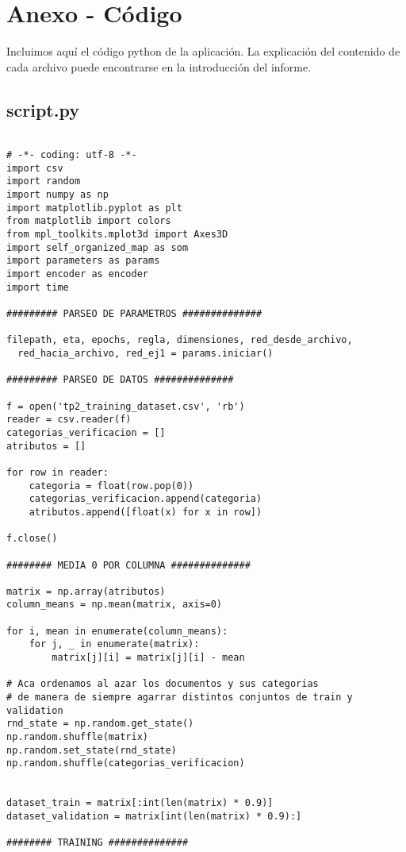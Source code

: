 \section{Anexo - Código}
Incluimos aquí el código python de la aplicación. La explicación del contenido de cada archivo puede encontrarse en la introducción del informe.

\subsection{script.py}

\begin{changemargin}{-2.0cm}{-1.5cm} 
\begin{verbatim}

# -*- coding: utf-8 -*-
import csv
import random
import numpy as np
import matplotlib.pyplot as plt
from matplotlib import colors
from mpl_toolkits.mplot3d import Axes3D
import self_organized_map as som
import parameters as params
import encoder as encoder
import time

######### PARSEO DE PARAMETROS ##############

filepath, eta, epochs, regla, dimensiones, red_desde_archivo, 
  red_hacia_archivo, red_ej1 = params.iniciar()

######### PARSEO DE DATOS ##############

f = open('tp2_training_dataset.csv', 'rb')
reader = csv.reader(f)
categorias_verificacion = []
atributos = []

for row in reader:
    categoria = float(row.pop(0))
    categorias_verificacion.append(categoria)
    atributos.append([float(x) for x in row])

f.close()

######## MEDIA 0 POR COLUMNA ##############

matrix = np.array(atributos)
column_means = np.mean(matrix, axis=0)

for i, mean in enumerate(column_means):
    for j, _ in enumerate(matrix):
        matrix[j][i] = matrix[j][i] - mean

# Aca ordenamos al azar los documentos y sus categorias
# de manera de siempre agarrar distintos conjuntos de train y validation
rnd_state = np.random.get_state()
np.random.shuffle(matrix)
np.random.set_state(rnd_state)
np.random.shuffle(categorias_verificacion)


dataset_train = matrix[:int(len(matrix) * 0.9)]
dataset_validation = matrix[int(len(matrix) * 0.9):]

######## TRAINING ##############


\end{verbatim}
\end{changemargin}
